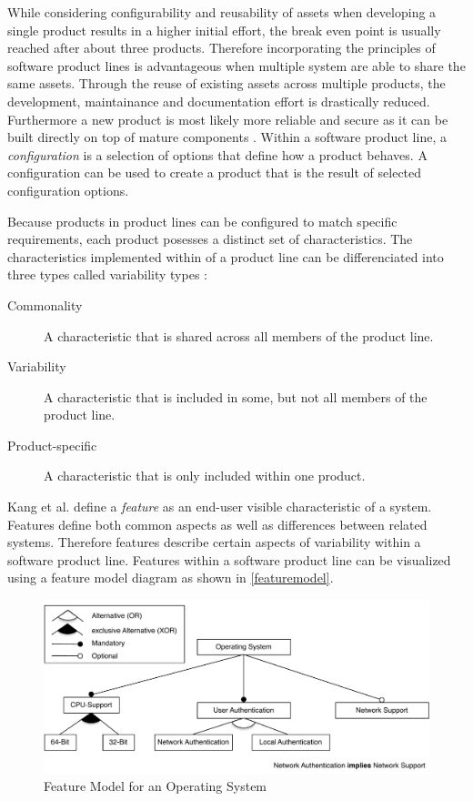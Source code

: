 \documentclass[a4paper]{article}
\begin{document}
While considering configurability and reusability of assets when developing a single product results in a higher initial effort, the break even point is usually reached after about three products. Therefore incorporating the principles of software product lines is advantageous when multiple system are able to share the same assets. Through the reuse of existing assets across multiple products, the development, maintainance and documentation effort is drastically reduced. Furthermore a new product is most likely more reliable and secure as it can be built directly on top of mature components  \cite[p.4f]{spl-in-action}. Within a software product line, a \emph{configuration} is a selection of options that define how a product behaves. A configuration can be used to create a product that is the result of selected configuration options.

Because products in product lines can be configured to match specific requirements, each product posesses a distinct set of characteristics. The characteristics implemented within of a product line can be differenciated into three types called variability types \cite[p.8]{spl-in-action}:
\begin{description}
\item[Commonality]  A characteristic that is shared across all members of the product line.
\item[Variability]  A characteristic that is included in some, but not all members of the product line.
\item[Product-specific]  A characteristic that is only included within one product. 
\end{description}

Kang et al. \cite{KangFeatureOrientedDomain1990} define a \emph{feature} as an end-user visible characteristic of a system. Features define both common aspects as well as differences between related systems. Therefore features describe certain aspects of variability within a software product line. Features within a software product line can be visualized using a feature model diagram as shown in \autoref{featuremodel}. 

\begin{figure}[h] 
  \centering
  \begin{minipage}[b]{1\textwidth} 
    \caption[Feature Model]{Feature Model for an Operating System}\label{featuremodel}
    \includegraphics[width=1\textwidth]{img/featuremodel.pdf}
  \end{minipage}
\end{figure}
\end{document}
